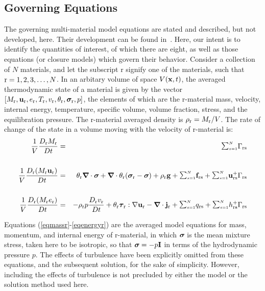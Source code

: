\subsection{Governing Equations}\label{sec:governing_equations}
The governing multi-material model equations are stated and described, but
not developed, here.  Their development can be found in~\cite{kashiwa2000}.
Here, our intent is to identify the quantities of interest, of which there
are eight, as well as those equations (or closure models) which govern their
behavior.  Consider a collection of $N$ materials, and let the subscript r
signify one of the materials, such that $\rmr = 1, 2, 3, \dots, N$.  In an
arbitary volume of space $V(\bfx,t)$, the averaged thermodynamic state of a
material is given by the vector $[M_\rmr, \bfu_\rmr, e_\rmr, T_\rmr, v_\rmr,
\theta_\rmr, \sig_\rmr, p]$, the elements of which are the r-material mass,
velocity, internal energy, temperature, specific volume, volume fraction,
stress, and the equilibration pressure.  The r-material averaged density is
$\rho_\rmr = M_\rmr/V$.  The rate of change of the state in a volume moving
with the velocity of r-material is:
%
\noindent
\begin{eqnarray}
{1\over V}{D_\rmr M_\rmr \over Dt} &=&
\SUM\Gamma_{\rmr\rms}
\label{eqmassr} \\
\nonumber \\
{1\over V}{D_\rmr (M_\rmr \bfu_\rmr) \over Dt} &=&
\theta_\rmr \bnabla\cdot\sig +
\bnabla\cdot\theta_\rmr(\sig_\rmr - \sig) + 
\rho_\rmr\bfg + 
\SUM \bff_{\rmr\rms} + 
\SUM \bfu_{\rmr\rms}^+ 
\Gamma_{\rmr\rms}
\label{eqmomr}\\ \nonumber \\
{1\over V}{D_\rmr (M_\rmr e_\rmr) \over Dt} &=& -
\rho_\rmr p {D_\rmr v_\rmr\over Dt} +
\theta_\rmr\taubold_\rmr:\nabla\bfu_\rmr - 
\bnabla\cdot\bfj_\rmr +
\SUM q_{\rmr\rms} +
\SUM h_{\rmr\rms}^+ 
\Gamma_{\rmr\rms}
\label{eqenergyr}
\end{eqnarray}

Equations (\ref{eqmassr}-\ref{eqenergyr}) are the averaged model equations
for mass, momentum, and internal energy of r-material, in which $\sig$ is
the mean mixture stress, taken here to be isotropic, so that $\sig = -p\bfI$
in terms of the hydrodynamic pressure $p$.  The effects of turbulence have
been explicitly omitted from these equations, and the subsequent solution,
for the sake of simplicity.  However, including the effects of turbulence
is not precluded by either the model or the solution method used here.


